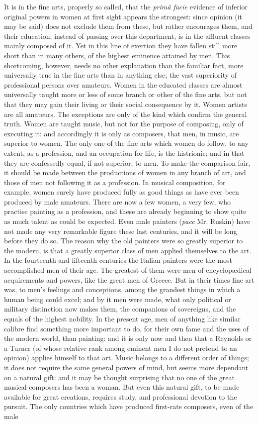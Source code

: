 \documentclass[12pt]{report}
\begin{document}
It is in the fine arts, properly so called, that the \emph{primâ facie} evidence of inferior original powers in women at first sight appears the strongest: since opinion (it may be said) does not exclude them from these, but rather encourages them, and their education, instead of passing over this department, is in the affluent classes mainly composed of it. Yet in this line of exertion they have fallen still more short than in many others, of the highest eminence attained by men. This shortcoming, however, needs no other explanation than the familiar fact, more universally true in the fine arts than in anything else; the vast superiority of professional persons over amateurs. Women in the educated classes are almost universally taught more or less of some branch or other of the fine arts, but not that they may gain their living or their social consequence by it. Women artists are all amateurs. The exceptions are only of the kind which confirm the general truth. Women are taught music, but not for the purpose of composing, only of executing it: and accordingly it is only as composers, that men, in music, are superior to women. The only one of the fine arts which women do follow, to any extent, as a profession, and an occupation for life, is the histrionic; and in that they are confessedly equal, if not superior, to men. To make the comparison fair, it should be made between the productions of women in any branch of art, and those of men not following it as a profession. In musical composition, for example, women surely have produced fully as good things as have ever been produced by male amateurs. There are now a few women, a very few, who practise painting as a profession, and these are already beginning to show quite as much talent as could be expected. Even male painters (\emph{pace} Mr. Ruskin) have not made any very remarkable figure these last centuries, and it will be long before they do so. The reason why the old painters were so greatly superior to the modern, is that a greatly superior class of men applied themselves to the art. In the fourteenth and fifteenth centuries the Italian painters were the most accomplished men of their age. The greatest of them were men of encyclopædical acquirements and powers, like the great men of Greece. But in their times fine art was, to men's feelings and conceptions, among the grandest things in which a human being could excel; and by it men were made, what only political or military distinction now makes them, the companions of sovereigns, and the equals of the highest nobility. In the present age, men of anything like similar calibre find something more important to do, for their own fame and the uses of the modern world, than painting: and it is only now and then that a Reynolds or a Turner (of whose relative rank among eminent men I do not pretend to an opinion) applies himself to that art. Music belongs to a different order of things; it does not require the same general powers of mind, but seems more dependant on a natural gift: and it may be thought surprising that no one of the great musical composers has been a woman. But even this natural gift, to be made available for great creations, requires study, and professional devotion to the pursuit. The only countries which have produced first-rate composers, even of the male 
\end{document}
